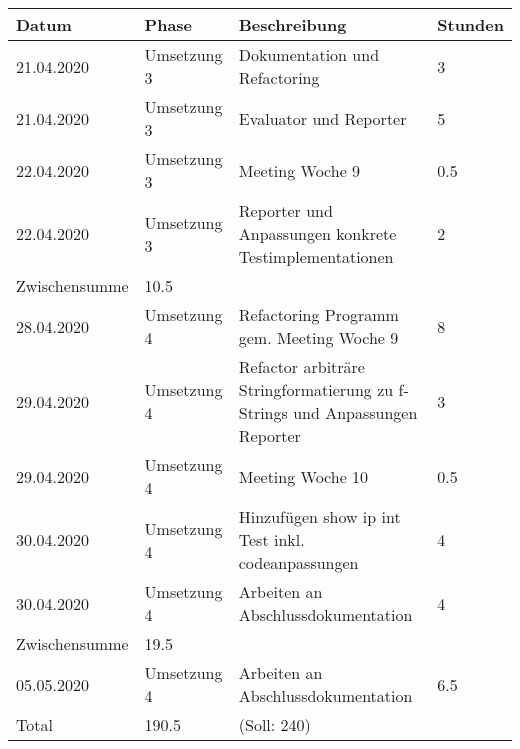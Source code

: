 \documentclass[
	ngerman,
	toc=listof, %
	toc=bibliography, %
	footnotes=multiple, %
	parskip=half, %
	numbers=noendperiod %
]{scrartcl}
\begin{document}
	\newpage

	\begin{tabularx}{\textwidth}{llXl}
		\toprule
		Datum & Phase & Beschreibung & Stunden \\
		\midrule
		21.04.2020 & Umsetzung 3 & Dokumentation und Refactoring & 3 \\
		21.04.2020 & Umsetzung 3 & Evaluator und Reporter & 5 \\
		22.04.2020 & Umsetzung 3 & Meeting Woche 9 & 0.5 \\
		22.04.2020 & Umsetzung 3 & Reporter und Anpassungen konkrete Testimplementationen & 2 \\
		\midrule
		Zwischensumme & 10.5 & & \\
		\midrule
		28.04.2020 & Umsetzung 4 & Refactoring Programm gem. Meeting Woche 9 & 8 \\
		29.04.2020 & Umsetzung 4 & Refactor arbiträre Stringformatierung zu f-Strings und Anpassungen Reporter & 3 \\
		29.04.2020 & Umsetzung 4 & Meeting Woche 10 & 0.5 \\
		30.04.2020 & Umsetzung 4 & Hinzufügen show ip int Test inkl. codeanpassungen & 4 \\
		30.04.2020 & Umsetzung 4 & Arbeiten an Abschlussdokumentation & 4 \\
		\midrule
		Zwischensumme & 19.5 & & \\
		\midrule
		05.05.2020 & Umsetzung 4 & Arbeiten an Abschlussdokumentation & 6.5 \\

		\midrule
		Total & 190.5 & (Soll: 240) & \\
		\bottomrule
	\end{tabularx}
\end{document}
